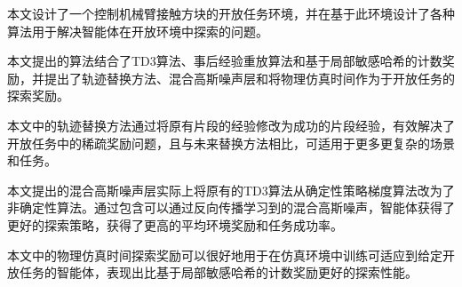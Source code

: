 \begin{conclusions}

    本文设计了一个控制机械臂接触方块的开放任务环境，并在基于此环境设计了各种算法用于解决智能体在开放环境中探索的问题。
    
    本文提出的算法结合了TD3算法、事后经验重放算法和基于局部敏感哈希的计数奖励，并提出了轨迹替换方法、混合高斯噪声层和将物理仿真时间作为于开放任务的探索奖励。

    本文中的轨迹替换方法通过将原有片段的经验修改为成功的片段经验，有效解决了开放任务中的稀疏奖励问题，且与未来替换方法相比，可适用于更多更复杂的场景和任务。

    本文提出的混合高斯噪声层实际上将原有的TD3算法从确定性策略梯度算法改为了非确定性算法。通过包含可以通过反向传播学习到的混合高斯噪声，智能体获得了更好的探索策略，获得了更高的平均环境奖励和任务成功率。

    本文中的物理仿真时间探索奖励可以很好地用于在仿真环境中训练可适应到给定开放任务的智能体，表现出比基于局部敏感哈希的计数奖励更好的探索性能。
\end{conclusions}
